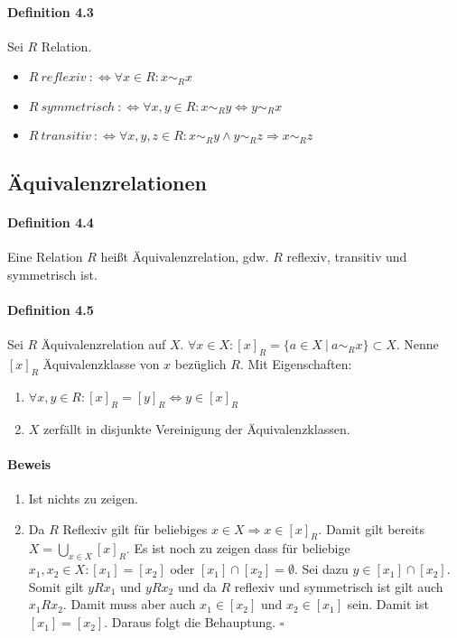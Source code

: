 \documentclass{scrartcl}
\begin{document}
\paragraph{Definition 4.3}
Sei $R$ Relation.
\begin{itemize}
\item $R~reflexiv~:\Leftrightarrow \forall x \in R: x \sim_R x$
\item $R~symmetrisch~:\Leftrightarrow \forall x,y \in R: x \sim_R y
  \Leftrightarrow y \sim_R x$
\item $R~transitiv~:\Leftrightarrow \forall x,y,z \in R: x \sim_R y \wedge y
  \sim_R z \Rightarrow x \sim_R z$
\end{itemize}

\subsection{Äquivalenzrelationen}
\label{subsec:aequivalenzeraltionen}

\paragraph{Definition 4.4}
Eine Relation $R$ heißt Äquivalenzrelation, gdw. $R$ reflexiv, transitiv und
symmetrisch ist.

\paragraph{Definition 4.5}
Sei $R$ Äquivalenzrelation auf $X$. $\forall x \in X: [x]_R = \{a \in X ~|~ a
\sim_R x\} \subset X$.
Nenne $[x]_R$ Äquivalenzklasse von $x$ bezüglich $R$. Mit Eigenschaften:
\begin{enumerate}
\item $\forall x,y \in R: [x]_R = [y]_R \Leftrightarrow y \in [x]_R$
\item $X$ zerfällt in disjunkte Vereinigung der Äquivalenzklassen.
\end{enumerate}
\paragraph{Beweis}
\begin{enumerate}{}
\item Ist nichts zu zeigen.
\item Da $R$ Reflexiv gilt für beliebiges $x \in X \Rightarrow x \in [x]_R$.
  Damit gilt bereits $X = \bigcup_{x \in X}[x]_{R}$. Es ist noch zu zeigen dass
  für beliebige $x_1,x_2 \in X: [x_1]=[x_2]$ oder $[x_1]\cap [x_2] = \emptyset$.
  Sei dazu $y \in [x_1]\cap [x_2]$. Somit gilt $yRx_1$ und $yRx_2$ und da $R$
  reflexiv und symmetrisch ist gilt auch $x_1Rx_2$. Damit muss aber auch $x_1
  \in [x_2]$ und $x_2 \in [x_1]$ sein. Damit ist $[x_1]=[x_2]$. Daraus folgt die
  Behauptung.
  \hfill $\square$
\end{enumerate}
\end{document}
